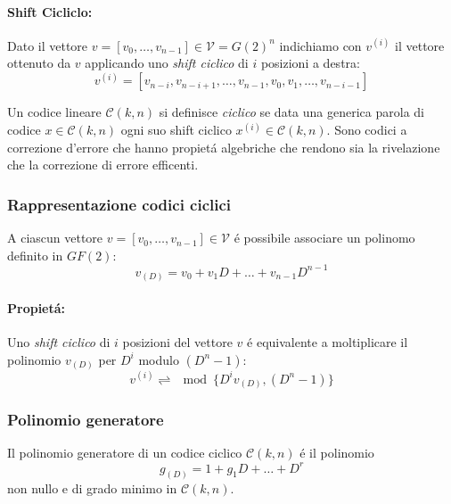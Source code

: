        \paragraph{Shift Cicliclo:}
            \begin{sloppypar}
                Dato il vettore ${v = [v_0,\dots,v_{n-1}]\in \mathcal{V} = G(2)^n}$ indichiamo con $v^{(i)}$ il vettore ottenuto da $v$ applicando uno 
                \emph{shift ciclico} di $i$ posizioni a destra:
                \[
                    v^{(i)} = [v_{n-i},v_{n-i+1}, \dots, v_{n-1},v_0,v_1,\dots, v_{n-i-1}]    
                \]     
            \end{sloppypar}
            Un codice lineare $\mathcal{C}(k,n)$ si definisce \emph{ciclico} se data una generica parola di codice $x\in \mathcal{C}(k,n)$ ogni suo
            shift ciclico $x^{(i)}\in \mathcal{C}(k,n)$. Sono codici a correzione d'errore che hanno propietá algebriche che rendono sia la rivelazione che la correzione
            di errore efficenti.
        \subsubsection{Rappresentazione codici ciclici}
            A ciascun vettore $v = [v_0,\dots,v_{n-1}]\in \mathcal{V}$ é possibile associare un polinomo definito in $GF(2)$:
            \[
                v_{(D)} = v_0 + v_1 D+\dots+ v_{n-1}D^{n-1}    
            \]
            \paragraph{Propietá:} Uno \emph{shift ciclico} di $i$ posizioni del vettore $v$ é equivalente a moltiplicare
            il polinomio $v_{(D)}$ per $D^i$ modulo $(D^n-1)$:
            \[
                v^{(i)} \rightleftharpoons \mod\{D^iv_{(D)},(D^n-1)\}    
            \]
        \subsubsection{Polinomio generatore}
            Il polinomio generatore di un codice ciclico $\mathcal{C}(k,n)$ é il polinomio
            \[
                g_{(D)} = 1+g_1D+ \dots + D^r    
            \]
            non nullo e di grado minimo in $\mathcal{C}(k,n)$.
